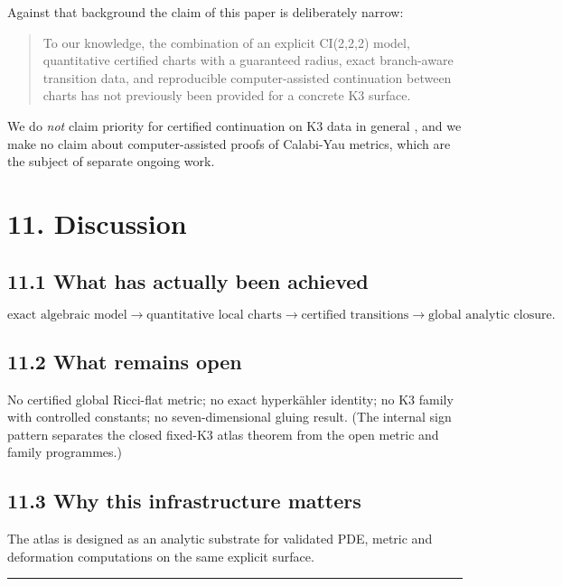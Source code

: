 Against that background the claim of this paper is deliberately narrow:

\begin{quote}
To our knowledge, the combination of an explicit CI(2,2,2) model, quantitative certified charts with a guaranteed radius, exact branch-aware transition data, and reproducible computer-assisted continuation between charts has not previously been provided for a concrete K3 surface.
\end{quote}

We do \emph{not} claim priority for certified continuation on K3 data in general \cite{11}, and we make no claim about computer-assisted proofs of Calabi-Yau metrics, which are the subject of separate ongoing work.

\section{11. Discussion}\label{discussion}

\subsection{11.1 What has actually been achieved}\label{what-has-actually-been-achieved}

\[\text{exact algebraic model} \rightarrow \text{quantitative local charts}
\rightarrow \text{certified transitions} \rightarrow \text{global analytic
closure}.\]

\subsection{11.2 What remains open}\label{what-remains-open}

No certified global Ricci-flat metric; no exact hyperkähler identity; no K3 family with controlled constants; no seven-dimensional gluing result. (The internal sign pattern separates the closed fixed-K3 atlas theorem from the open metric and family programmes.)

\subsection{11.3 Why this infrastructure matters}\label{why-this-infrastructure-matters}

The atlas is designed as an analytic substrate for validated PDE, metric and deformation computations on the same explicit surface.

\begin{center}\rule{\linewidth}{0.5pt}\end{center}

